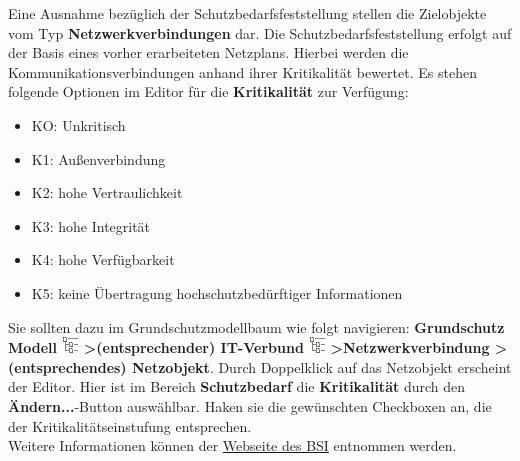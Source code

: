 \documentclass[a4paper,10pt]{book}
\begin{document}
Eine Ausnahme bezüglich der Schutzbedarfsfeststellung stellen die Zielobjekte vom Typ \textbf{Netzwerkverbindungen} dar. Die Schutzbedarfsfeststellung erfolgt auf der Basis eines vorher erarbeiteten Netzplans. Hierbei werden die Kommunikationsverbindungen anhand ihrer Kritikalität bewertet. Es stehen folgende Optionen im Editor für die \textbf{Kritikalität} zur Verfügung:
\begin{itemize}
 \item KO: Unkritisch
 \item K1: Außenverbindung
 \item K2: hohe Vertraulichkeit
 \item K3: hohe Integrität
 \item K4: hohe Verfügbarkeit
 \item K5: keine Übertragung hochschutzbedürftiger Informationen
\end{itemize}
Sie sollten dazu im Grundschutzmodellbaum wie folgt navigieren: \textbf{Grundschutz Modell
\includegraphics[height=2ex]{Icon/GS_Modell.png} \textgreater (entsprechender) IT-Verbund \includegraphics[height=2ex]{Icon/GS_Modell.png}
\textgreater Netzwerkverbindung \textgreater (entsprechendes) Netzobjekt}. Durch Doppelklick auf das Netzobjekt erscheint der Editor.
Hier ist im Bereich \textbf{Schutzbedarf} die \textbf{Kritikalität} durch den \textbf{Ändern...}-Button auswählbar.
Haken sie die gewünschten Checkboxen an, die der Kritikalitätseinstufung entsprechen.
\newline\\
Weitere Informationen können der \href{https://www.bsi.bund.de/cln_156/ContentBSI/grundschutz/webkurs/gskurs/seiten/s4000_htm.html}{Webseite des BSI}
entnommen werden.
\end{document}
